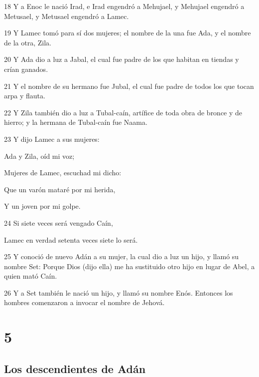 \par 18 Y a Enoc le nació Irad, e Irad engendró a Mehujael, y Mehujael engendró a Metusael, y Metusael engendró a Lamec.
\par 19 Y Lamec tomó para sí dos mujeres; el nombre de la una fue Ada, y el nombre de la otra, Zila.
\par 20 Y Ada dio a luz a Jabal, el cual fue padre de los que habitan en tiendas y crían ganados.
\par 21 Y el nombre de su hermano fue Jubal, el cual fue padre de todos los que tocan arpa y flauta.
\par 22 Y Zila también dio a luz a Tubal-caín, artífice de toda obra de bronce y de hierro; y la hermana de Tubal-caín fue Naama.
\par 23 Y dijo Lamec a sus mujeres:
\par Ada y Zila, oíd mi voz;
\par Mujeres de Lamec, escuchad mi dicho:
\par Que un varón mataré por mi herida,
\par Y un joven por mi golpe.
\par 24 Si siete veces será vengado Caín,
\par Lamec en verdad setenta veces siete lo será.
\par 25 Y conoció de nuevo Adán a su mujer, la cual dio a luz un hijo, y llamó su nombre Set: Porque Dios (dijo ella) me ha sustituido otro hijo en lugar de Abel, a quien mató Caín.
\par 26 Y a Set también le nació un hijo, y llamó su nombre Enós. Entonces los hombres comenzaron a invocar el nombre de Jehová.

\chapter{5}

\section*{Los descendientes de Adán}

